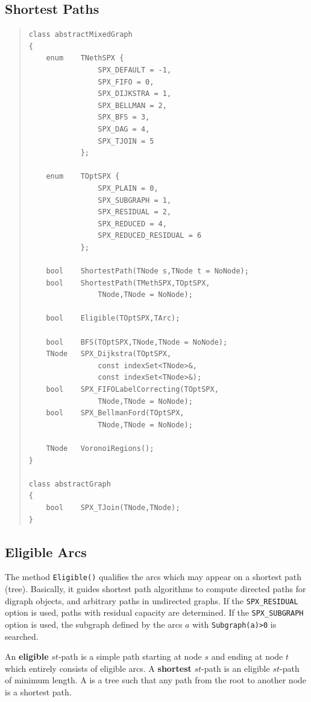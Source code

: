\documentclass[a4paper,11pt,twoside]{book}
\begin{document}
\begin{multicols}{2}
\section{Shortest Paths}
\label{slb_solve_shortest_path}
\methods
\begin{quote}
\begin{verbatim}
class abstractMixedGraph
{
    enum    TNethSPX {
                SPX_DEFAULT = -1,
                SPX_FIFO = 0,
                SPX_DIJKSTRA = 1,
                SPX_BELLMAN = 2,
                SPX_BFS = 3,
                SPX_DAG = 4,
                SPX_TJOIN = 5
            };

    enum    TOptSPX {
                SPX_PLAIN = 0,
                SPX_SUBGRAPH = 1,
                SPX_RESIDUAL = 2,
                SPX_REDUCED = 4,
                SPX_REDUCED_RESIDUAL = 6
            };

    bool    ShortestPath(TNode s,TNode t = NoNode);
    bool    ShortestPath(TMethSPX,TOptSPX,
                TNode,TNode = NoNode);

    bool    Eligible(TOptSPX,TArc);

    bool    BFS(TOptSPX,TNode,TNode = NoNode);
    TNode   SPX_Dijkstra(TOptSPX,
                const indexSet<TNode>&,
                const indexSet<TNode>&);
    bool    SPX_FIFOLabelCorrecting(TOptSPX,
                TNode,TNode = NoNode);
    bool    SPX_BellmanFord(TOptSPX,
                TNode,TNode = NoNode);

    TNode   VoronoiRegions();
}

class abstractGraph
{
    bool    SPX_TJoin(TNode,TNode);
}
\end{verbatim}
\end{quote}

\subsection{Eligible Arcs}
The method \verb/Eligible()/ qualifies the arcs which may appear on a shortest
path (tree). Basically, it guides shortest path algorithms to compute directed
paths for digraph objects, and arbitrary paths in undirected graphs. If the
\verb/SPX_RESIDUAL/ option is used, paths with residual capacity are
determined. If the \verb/SPX_SUBGRAPH/ option is used, the subgraph defined
by the arcs $a$ with \verb/Subgraph(a)>0/ is searched.

An {\bf eligible} $st$-path is a simple path starting
at node $s$ and ending at node $t$ which entirely consists of eligible arcs. A
{\bf shortest} $st$-path is an eligible $st$-path of minimum length. A
 is a tree such that any path from the root to another
node is a shortest path.


\end{multicols}
\end{document}
